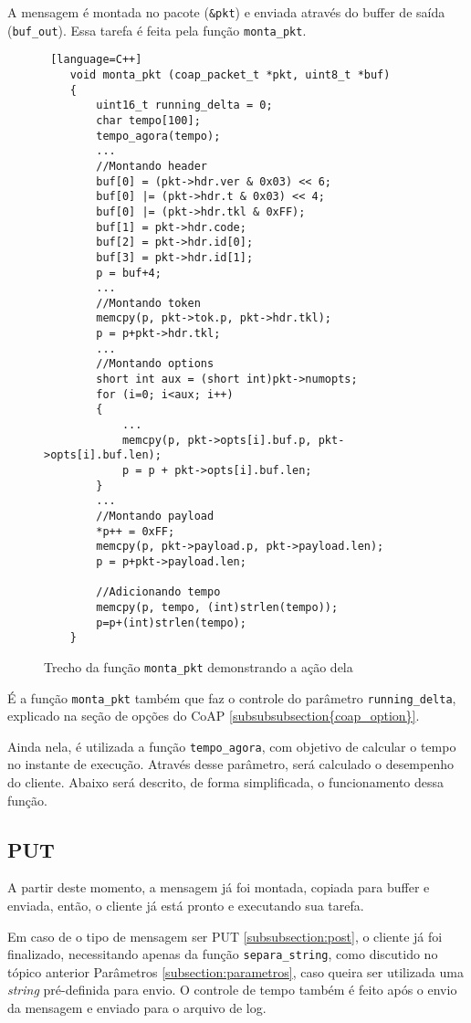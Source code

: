 A mensagem é montada no pacote (\texttt{\&pkt}) e enviada através do buffer de saída (\texttt{buf\_out}). Essa tarefa é feita pela função \texttt{monta\_pkt}.
\begin{figure}[!htb]
	\begin{lstlisting} [language=C++]
	void monta_pkt (coap_packet_t *pkt, uint8_t *buf)
	{
		uint16_t running_delta = 0;
		char tempo[100];
		tempo_agora(tempo);
		...
		//Montando header
		buf[0] = (pkt->hdr.ver & 0x03) << 6;
		buf[0] |= (pkt->hdr.t & 0x03) << 4;
		buf[0] |= (pkt->hdr.tkl & 0xFF);
		buf[1] = pkt->hdr.code;
		buf[2] = pkt->hdr.id[0];
		buf[3] = pkt->hdr.id[1];
		p = buf+4;
		...
		//Montando token
		memcpy(p, pkt->tok.p, pkt->hdr.tkl);
		p = p+pkt->hdr.tkl;
		...
		//Montando options
		short int aux = (short int)pkt->numopts;
		for (i=0; i<aux; i++)
		{
			...
			memcpy(p, pkt->opts[i].buf.p, pkt->opts[i].buf.len);
			p = p + pkt->opts[i].buf.len;
		}
		...
		//Montando payload
		*p++ = 0xFF;
		memcpy(p, pkt->payload.p, pkt->payload.len);
		p = p+pkt->payload.len;
		
		//Adicionando tempo
		memcpy(p, tempo, (int)strlen(tempo));
		p=p+(int)strlen(tempo);
	}
	\end{lstlisting}
	\caption{Trecho da função \texttt{monta\_pkt} demonstrando a ação dela}
	\label{code:montar_pkt}
\end{figure}

É a função \texttt{monta\_pkt} também que faz o controle do parâmetro \texttt{running\_delta}, explicado na seção de opções do CoAP \ref{subsubsubsection{coap_option}}.

Ainda nela, é utilizada a função \texttt{tempo\_agora}, com objetivo de calcular o tempo no instante de execução. Através desse parâmetro, será calculado o desempenho do cliente. Abaixo será descrito, de forma simplificada, o funcionamento dessa função.

\verb||

\subsection{PUT}

A partir deste momento, a mensagem já foi montada, copiada para buffer e enviada, então, o cliente já está pronto e executando sua tarefa. 

Em caso de o tipo de mensagem ser PUT \ref{subsubsection:post}, o cliente já foi finalizado, necessitando apenas da função \texttt{separa\_string}, como discutido no tópico anterior Parâmetros \ref{subsection:parametros}, caso queira ser utilizada uma \textit{string} pré-definida para envio. O controle de tempo também é feito após o envio da mensagem e enviado para o arquivo de log.

